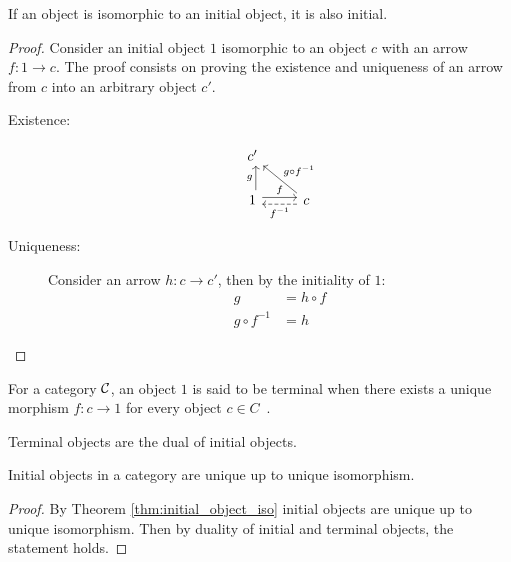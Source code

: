 \begin{theorem}
  If an object is isomorphic to an initial object, it is also initial.

  \begin{proof}
    Consider an initial object $1$ isomorphic to an object $c$ with an arrow
    $f:1\to c$. The proof consists on proving the existence and uniqueness of an
    arrow from $c$ into an arbitrary object $c'$.

    \begin{description}
      \item[Existence:]
        \[\begin{tikzcd}[ampersand replacement=\&]
          {c'} \\
          1 \& c
          \arrow["f", shift left=1, from=2-1, to=2-2]
          \arrow["{f^{-1}}", shift left=1, dashed, from=2-2, to=2-1]
          \arrow["g", shift right=1, from=2-1, to=1-1]
          \arrow["{g\circ f^{-1}}"', from=2-2, to=1-1]
        \end{tikzcd}\]
      \item[Uniqueness:] Consider an arrow $h:c\to c'$, then by the initiality
        of $1$:
        \[
          \begin{aligned}
            g &= h\circ f\\
            g\circ f^{-1} &= h
          \end{aligned}
        \]
    \end{description}
  \end{proof}
\end{theorem}

\begin{definition}
  For a category $\mathcal{C}$, an object $1$ is said to be terminal when there exists a
  unique morphism $f: c\to 1$ for every object $c\in
  C$~\parencite[p.~48]{leinster:basic_category_theory}.
\end{definition}

\begin{remark}
  Terminal objects are the dual of initial objects.
\end{remark}

\begin{theorem}
  Initial objects in a category are unique up to unique isomorphism.

  \begin{proof}
    By Theorem \ref{thm:initial_object_iso} initial objects are unique up to
    unique isomorphism. Then by duality of initial and terminal objects, the
    statement holds.
  \end{proof}
\end{theorem}

